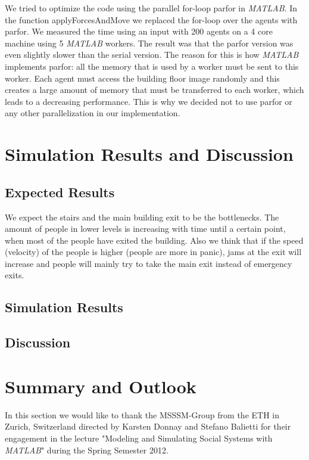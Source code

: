 \documentclass[11pt]{article}
\begin{document}
We tried to optimize the code using the parallel for-loop parfor in \textit{MATLAB}. In
the function applyForcesAndMove we replaced the for-loop over the agents with
parfor. We measured the time using an input with 200 agents on a 4 core machine
using 5 \textit{MATLAB} workers. The result was that the parfor version was even slightly
slower than the serial version. The reason for this is how \textit{MATLAB} implements
parfor: all the memory that is used by a worker must be sent to this worker.
Each agent must access the building floor image randomly and this creates a
large amount of memory that must be transferred to each worker, which leads to a
decreasing performance.
This is why we decided not to use parfor or any other parallelization in our
implementation.

\section{Simulation Results and Discussion}

\subsection{Expected Results}

We expect the stairs and the main building exit to be the bottlenecks. The amount of people in lower levels is increasing with time until a certain point, when most of the people have exited the building. Also we think that if the speed (velocity) of the people is higher (people are more in panic), jams at the exit will increase and people will mainly try to take the main exit instead of emergency exits.

\subsection{Simulation Results}


\subsection{Discussion}


\section{Summary and Outlook}

In this section we would like to thank the MSSSM-Group from the ETH in Zurich, Switzerland directed by Karsten Donnay and Stefano Balietti for their engagement in the lecture "Modeling and Simulating Social Systems with \textit{MATLAB}" during the Spring Semester 2012.
\end{document}
